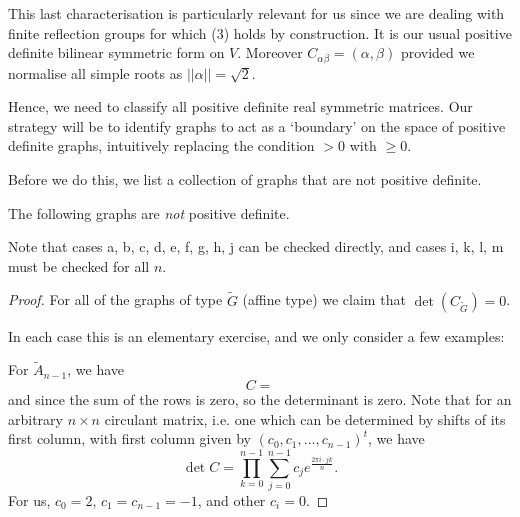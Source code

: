 This last characterisation is particularly relevant for us since we are dealing
with finite reflection groups for which (3) holds by construction. It is our
usual positive definite bilinear symmetric form on $V$.
Moreover $C_{\alpha \beta} = (\alpha, \beta)$ provided we normalise all simple
roots as $||\alpha|| = \sqrt{2}$.

Hence, we need to classify all positive definite real symmetric matrices.
Our strategy will be to identify graphs
to act as a `boundary' on the space of positive definite graphs, intuitively
replacing the condition $>0$ with $\geq 0$.

Before we do this, we list a collection of graphs that are not positive definite.

\begin{lemma} \label{lem15}
The following graphs are {\em not} positive definite.
\end{lemma}


Note that cases a, b, c, d, e, f, g, h, j can be checked directly, and cases
i, k, l, m must be checked for all $n$.

\begin{proof}
For all of the graphs of type $\widetilde{G}$ (affine type) we claim that $\det
(C_{\widetilde{G}}) = 0$.

In each case this is an elementary exercise, and we only consider a few examples:

For $\widetilde{A}_{n-1}$, we have
\[
    C = %
\]
and since the sum of the rows is zero, so the determinant is zero.
Note that for an arbitrary $n \times n$ circulant matrix, i.e. one which can
be determined by shifts of its first column, with first column given by
$(c_0, c_1, \dots, c_{n-1})^t$, we have
\[
    \det C = \prod_{k=0}^{n-1} \sum_{j=0}^{n-1} c_j e^{\frac{2\pi i \cdot jk}{n}}.
\]
For us, $c_0 = 2$, $c_1 = c_{n-1} = -1$, and other $c_i = 0$.
\end{proof}
